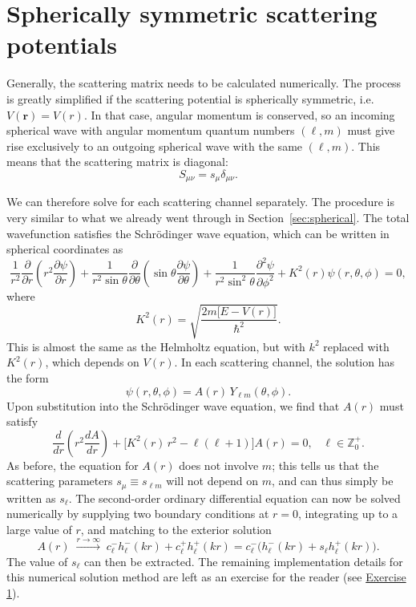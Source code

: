\documentclass[pra,12pt]{revtex4}
\begin{document}
\section{Spherically symmetric scattering potentials}

Generally, the scattering matrix needs to be calculated numerically.
The process is greatly simplified if the scattering potential is
spherically symmetric, i.e.~$V(\mathbf{r}) = V(r)$.  In that case,
angular momentum is conserved, so an incoming spherical wave with
angular momentum quantum numbers $(\ell,m)$ must give rise exclusively
to an outgoing spherical wave with the same $(\ell,m)$.  This means
that the scattering matrix is diagonal:
$$S_{\mu \nu} = s_\mu \delta_{\mu\nu}.$$

We can therefore solve for each scattering channel separately.  The
procedure is very similar to what we already went through in
Section~\ref{sec:spherical}.  The total wavefunction satisfies the
Schr\"odinger wave equation, which can be written in spherical
coordinates as
$$\frac{1}{r^2}\frac{\partial}{\partial r}\left(r^2\frac{\partial \psi}{\partial r}\right) + \frac{1}{r^2\sin\theta}\frac{\partial}{\partial\theta}\left(\sin\theta\frac{\partial\psi}{\partial\theta}\right)+\frac{1}{r^2\sin^2\theta}\frac{\partial^2\psi}{\partial\phi^2} + K^2(r) \psi(r,\theta,\phi) = 0,$$
where
$$K^2(r) = \sqrt{\frac{2m\big[E-V(r)\big]}{\hbar^2}}.$$
This is almost the same as the Helmholtz equation, but with $k^2$
replaced with $K^2(r)$, which depends on $V(r)$.  In each
scattering channel, the solution has the form
$$\psi(r,\theta,\phi) = A(r) \, Y_{\ell m}(\theta, \phi).$$
Upon substitution into the Schr\"odinger wave equation, we find that
$A(r)$ must satisfy
$$\frac{d}{dr}\left(r^2\frac{dA}{dr}\right) + \Big[K^2(r)\, r^2 - \ell(\ell+1)\Big] A(r) = 0, \;\;\;\ell \in \mathbb{Z}_0^+.$$
As before, the equation for $A(r)$ does not involve $m$; this tells us
that the scattering parameters $s_\mu \equiv s_{\ell m}$ will not
depend on $m$, and can thus simply be written as $s_\ell$.  The
second-order ordinary differential equation can now be solved
numerically by supplying two boundary conditions at $r=0$, integrating
up to a large value of $r$, and matching to the exterior solution
$$A(r) \; \overset{r\rightarrow\infty}{\longrightarrow} \; c^-_\ell h^-_\ell(kr) + c^+_\ell h^+_\ell(kr) = c^-_\ell \Big(h^-_\ell(kr) + s_\ell h^+_\ell(kr)\Big).$$
The value of $s_\ell$ can then be extracted.  The remaining
implementation details for this numerical solution method are left as
an exercise for the reader (see
\hyperref[ex:numerical_spherical]{Exercise 1}).
\end{document}
